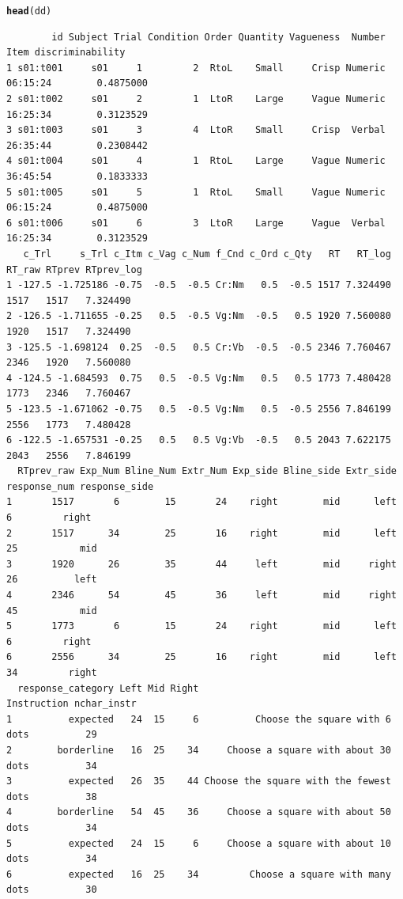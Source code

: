 \documentclass[a4paper,12pt]{article}\usepackage[]{graphicx}\usepackage[]{color}
\makeatletter
\newcommand{\hlstd}[1]{\textcolor[rgb]{0.345,0.345,0.345}{#1}}%
\newcommand{\hlkwd}[1]{\textcolor[rgb]{0.737,0.353,0.396}{\textbf{#1}}}%
\newenvironment{kframe}{%
 \def\at@end@of@kframe{}%
 \ifinner\ifhmode%
  \def\at@end@of@kframe{\end{minipage}}%
  \begin{minipage}{\columnwidth}%
 \fi\fi%
 \def\FrameCommand##1{\hskip\@totalleftmargin \hskip-\fboxsep
 \colorbox{shadecolor}{##1}\hskip-\fboxsep
     \hskip-\linewidth \hskip-\@totalleftmargin \hskip\columnwidth}%
 \MakeFramed {\advance\hsize-\width
   \@totalleftmargin\z@ \linewidth\hsize
   \@setminipage}}%
 {\par\unskip\endMakeFramed%
 \at@end@of@kframe}
\newenvironment{knitrout}{}{} %
\makeatother
\begin{document}
\begin{knitrout}\scriptsize
{}\color{fgcolor}\begin{kframe}
\begin{alltt}
\hlkwd{head}\hlstd{(dd)}
\end{alltt}
\begin{verbatim}
        id Subject Trial Condition Order Quantity Vagueness  Number     Item discriminability
1 s01:t001     s01     1         2  RtoL    Small     Crisp Numeric 06:15:24        0.4875000
2 s01:t002     s01     2         1  LtoR    Large     Vague Numeric 16:25:34        0.3123529
3 s01:t003     s01     3         4  LtoR    Small     Crisp  Verbal 26:35:44        0.2308442
4 s01:t004     s01     4         1  RtoL    Large     Vague Numeric 36:45:54        0.1833333
5 s01:t005     s01     5         1  RtoL    Small     Vague Numeric 06:15:24        0.4875000
6 s01:t006     s01     6         3  LtoR    Large     Vague  Verbal 16:25:34        0.3123529
   c_Trl     s_Trl c_Itm c_Vag c_Num f_Cnd c_Ord c_Qty   RT   RT_log RT_raw RTprev RTprev_log
1 -127.5 -1.725186 -0.75  -0.5  -0.5 Cr:Nm   0.5  -0.5 1517 7.324490   1517   1517   7.324490
2 -126.5 -1.711655 -0.25   0.5  -0.5 Vg:Nm  -0.5   0.5 1920 7.560080   1920   1517   7.324490
3 -125.5 -1.698124  0.25  -0.5   0.5 Cr:Vb  -0.5  -0.5 2346 7.760467   2346   1920   7.560080
4 -124.5 -1.684593  0.75   0.5  -0.5 Vg:Nm   0.5   0.5 1773 7.480428   1773   2346   7.760467
5 -123.5 -1.671062 -0.75   0.5  -0.5 Vg:Nm   0.5  -0.5 2556 7.846199   2556   1773   7.480428
6 -122.5 -1.657531 -0.25   0.5   0.5 Vg:Vb  -0.5   0.5 2043 7.622175   2043   2556   7.846199
  RTprev_raw Exp_Num Bline_Num Extr_Num Exp_side Bline_side Extr_side response_num response_side
1       1517       6        15       24    right        mid      left            6         right
2       1517      34        25       16    right        mid      left           25           mid
3       1920      26        35       44     left        mid     right           26          left
4       2346      54        45       36     left        mid     right           45           mid
5       1773       6        15       24    right        mid      left            6         right
6       2556      34        25       16    right        mid      left           34         right
  response_category Left Mid Right                            Instruction nchar_instr
1          expected   24  15     6          Choose the square with 6 dots          29
2        borderline   16  25    34     Choose a square with about 30 dots          34
3          expected   26  35    44 Choose the square with the fewest dots          38
4        borderline   54  45    36     Choose a square with about 50 dots          34
5          expected   24  15     6     Choose a square with about 10 dots          34
6          expected   16  25    34         Choose a square with many dots          30
\end{verbatim}
\end{kframe}
\end{knitrout}
\end{document}
